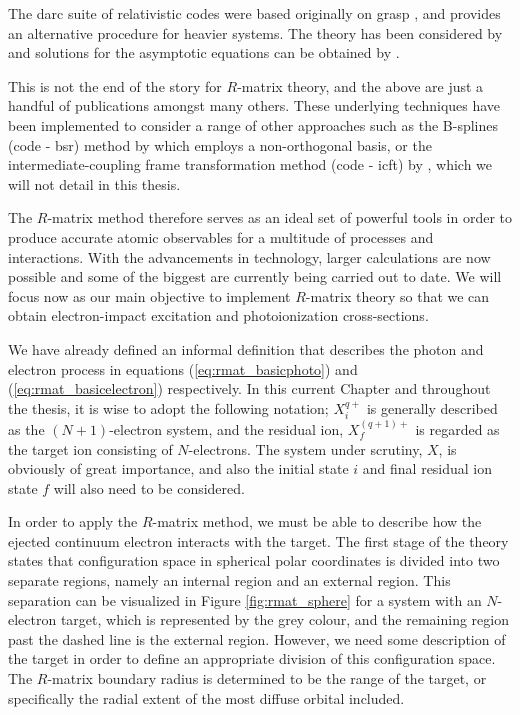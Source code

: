 The {\sc darc} suite of relativistic codes were based originally on {\sc grasp} \citep{1979CoPhC..17..149G}, and provides an alternative procedure for heavier systems. The theory has been considered by \citet{1975JPhB....8.2327C} and solutions for the asymptotic equations can be obtained by \citet{1994CoPhC..83..215Y}.

This is not the end of the story for $R$-matrix theory, and the above are just a handful of publications amongst many others. These underlying techniques have been implemented to consider a range of other approaches such as the B-splines (code - {\sc bsr}) method by \citet{2006CoPhC.174..273Z} which employs a non-orthogonal basis, or the intermediate-coupling frame transformation method (code - {\sc icft}) by \citet{1998JPhB...31.3713G}, which we will not detail in this thesis.

The $R$-matrix method therefore serves as an ideal set of powerful tools in order to produce accurate atomic observables for a multitude of processes and interactions. With the advancements in technology, larger calculations are now possible and some of the biggest are currently being carried out to date. We will focus now as our main objective to implement $R$-matrix theory so that we can obtain electron-impact excitation and photoionization cross-sections.

We have already defined an informal definition that describes the photon and electron process in equations (\ref{eq:rmat_basicphoto}) and (\ref{eq:rmat_basicelectron}) respectively. In this current Chapter and throughout the thesis, it is wise to adopt the following notation; $X_i^{q+}$ is generally described as the $(N+1)$-electron system, and the residual ion, $X_f^{(q+1)+}$ is regarded as the target ion consisting of $N$-electrons. The system under scrutiny, $X$, is obviously of great importance, and also the initial state $i$ and final residual ion state $f$ will also need to be considered.

In order to apply the $R$-matrix method, we must be able to describe how the ejected continuum electron interacts with the target. The first stage of the theory states that configuration space in spherical polar coordinates is divided into two separate regions, namely an internal region and an external region. This separation can be visualized in Figure \ref{fig:rmat_sphere} for a system with an $N$-electron target, which is represented by the grey colour, and the remaining region past the dashed line is the external region. However, we need some description of the target in order to define an appropriate division of this configuration space. The $R$-matrix boundary radius is determined to be the range of the target, or specifically the radial extent of the most diffuse orbital included.

